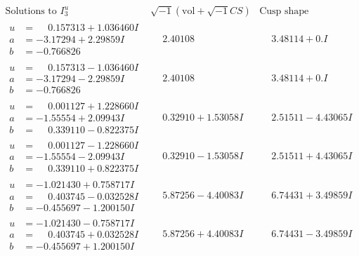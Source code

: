 \documentclass[1p]{elsarticle_modified}
\theoremstyle{definition}
\newcommand{\I}{\sqrt{-1}}
\begin{document}
$$\begin{array}{c|c|c}  
\text{Solutions to }I^u_{3}& \I (\text{vol} + \sqrt{-1}CS) & \text{Cusp shape}\\
 \hline 
\begin{aligned}
u &= \phantom{-}0.157313 + 1.036460 I \\
a &= -3.17294 + 2.29859 I \\
b &= -0.766826\phantom{ +0.000000I}\end{aligned}
 & \phantom{-}2.40108\phantom{ +0.000000I} & \phantom{-}3.48114 + 0. I\phantom{ +0.000000I} \\ \hline\begin{aligned}
u &= \phantom{-}0.157313 - 1.036460 I \\
a &= -3.17294 - 2.29859 I \\
b &= -0.766826\phantom{ +0.000000I}\end{aligned}
 & \phantom{-}2.40108\phantom{ +0.000000I} & \phantom{-}3.48114 + 0. I\phantom{ +0.000000I} \\ \hline\begin{aligned}
u &= \phantom{-}0.001127 + 1.228660 I \\
a &= -1.55554 + 2.09943 I \\
b &= \phantom{-}0.339110 - 0.822375 I\end{aligned}
 & \phantom{-}0.32910 + 1.53058 I & \phantom{-}2.51511 - 4.43065 I \\ \hline\begin{aligned}
u &= \phantom{-}0.001127 - 1.228660 I \\
a &= -1.55554 - 2.09943 I \\
b &= \phantom{-}0.339110 + 0.822375 I\end{aligned}
 & \phantom{-}0.32910 - 1.53058 I & \phantom{-}2.51511 + 4.43065 I \\ \hline\begin{aligned}
u &= -1.021430 + 0.758717 I \\
a &= \phantom{-}0.403745 - 0.032528 I \\
b &= -0.455697 - 1.200150 I\end{aligned}
 & \phantom{-}5.87256 - 4.40083 I & \phantom{-}6.74431 + 3.49859 I \\ \hline\begin{aligned}
u &= -1.021430 - 0.758717 I \\
a &= \phantom{-}0.403745 + 0.032528 I \\
b &= -0.455697 + 1.200150 I\end{aligned}
 & \phantom{-}5.87256 + 4.40083 I & \phantom{-}6.74431 - 3.49859 I \\ \hline\begin{aligned}

\end{aligned}
\end{array}$$
\end{document}
